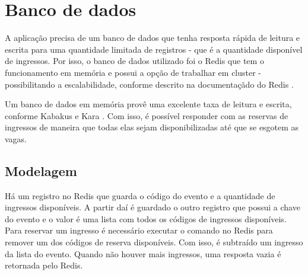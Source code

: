 \section{Banco de dados}\label{banco-de-dados}

A aplicação precisa de um banco de dados que tenha resposta rápida de leitura e
escrita para uma quantidade limitada de registros - que é a quantidade disponível
de ingressos. Por isso, o banco de dados utilizado foi o Redis que tem o funcionamento
em memória e possui a opção de trabalhar em cluster - possibilitando a escalabilidade,
conforme descrito na documentaçãdo do Redis \cite{redis-cluster-specification}.


Um banco de dados em memória provê uma excelente taxa de leitura e escrita, conforme
Kabakus e Kara \cite{a-performance-evaluation-of-in-memory-databases}.
Com isso, é possível responder com as reservas de ingressos de maneira que todas elas
sejam disponibilizadas até que se esgotem as vagas.

\subsection{Modelagem}

Há um registro no Redis que guarda o código do evento e a quantidade de ingressos
disponíveis. A partir daí é guardado o outro registro que possui a chave do evento
e o valor é uma lista com todos os códigos de ingressos disponíveis. Para reservar
um ingresso é necessário executar o comando no Redis para remover um dos códigos
de reserva disponíveis. Com isso, é subtraído um ingresso da lista do evento. Quando
não houver mais ingressos, uma resposta vazia é retornada pelo Redis.
